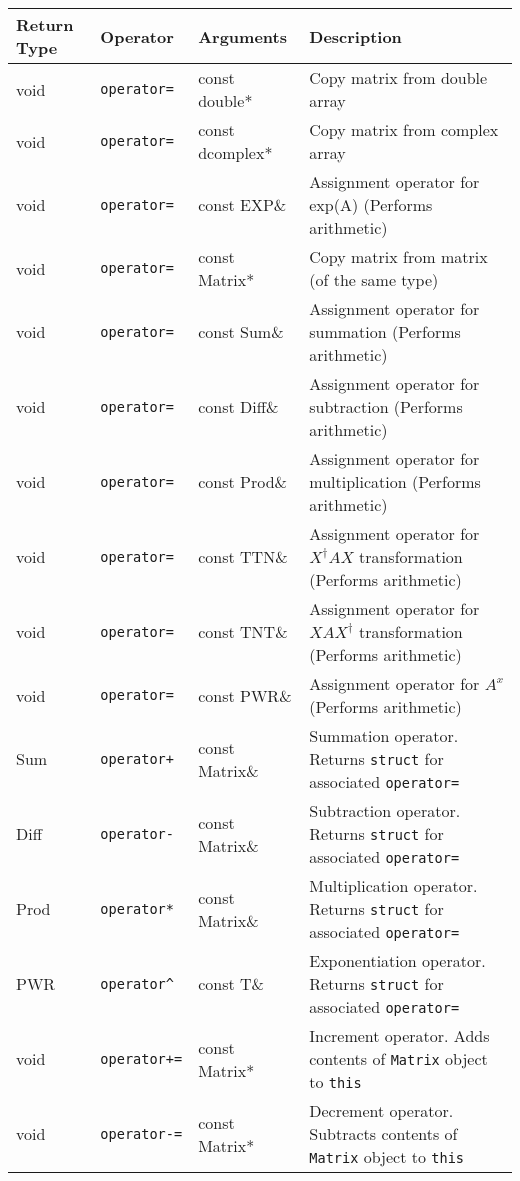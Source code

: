 \documentclass[english,journal=jctcce,manuscript=article,etalmode=truncate,maxauthors=0]{article}
\begin{document}
\begin{table}[h!]
\begin{tabular}{|l|l|l|l|}
\hline
\textbf{Return Type} & \textbf{Operator} & \textbf{Arguments} & \textbf{Description}\\
\hline
void &\texttt{operator=}&const double*        & Copy matrix from double array \\
void &\texttt{operator=}&const dcomplex*      & Copy matrix from complex array\\
void &\texttt{operator=}&const EXP\&          & Assignment operator for exp(A) (Performs arithmetic)\\
void &\texttt{operator=}&const Matrix*        & Copy matrix from matrix (of the same type)\\
void &\texttt{operator=}&const Sum\&          & Assignment operator for summation (Performs arithmetic)\\
void &\texttt{operator=}&const Diff\&         & Assignment operator for subtraction (Performs arithmetic)\\
void &\texttt{operator=}&const Prod\&         & Assignment operator for multiplication (Performs arithmetic)\\
void &\texttt{operator=}&const TTN\&          & Assignment operator for $X^\dagger AX$ transformation (Performs arithmetic)\\
void &\texttt{operator=}&const TNT\&          & Assignment operator for $X AX^\dagger$ transformation (Performs arithmetic)\\
void &\texttt{operator=}&const PWR\&          & Assignment operator for $A^x$ (Performs arithmetic)\\
Sum  &\texttt{operator+}&const Matrix\&       & Summation operator. Returns \texttt{struct} for associated \texttt{operator=}\\
Diff &\texttt{operator-}&const Matrix\&       & Subtraction operator. Returns \texttt{struct} for associated \texttt{operator=}\\
Prod &\texttt{operator*}&const Matrix\&       & Multiplication operator. Returns \texttt{struct} for associated \texttt{operator=}\\
PWR  &\texttt{operator\^{}}&const T\&         & Exponentiation operator. Returns \texttt{struct} for associated \texttt{operator=}\\
void &\texttt{operator+=}&const Matrix*       & Increment operator. Adds contents of \texttt{Matrix} object to \texttt{this} \\
void &\texttt{operator-=}&const Matrix*       & Decrement operator. Subtracts contents of \texttt{Matrix} object to \texttt{this} \\
\hline
\end{tabular}
\end{table}
\end{document}
